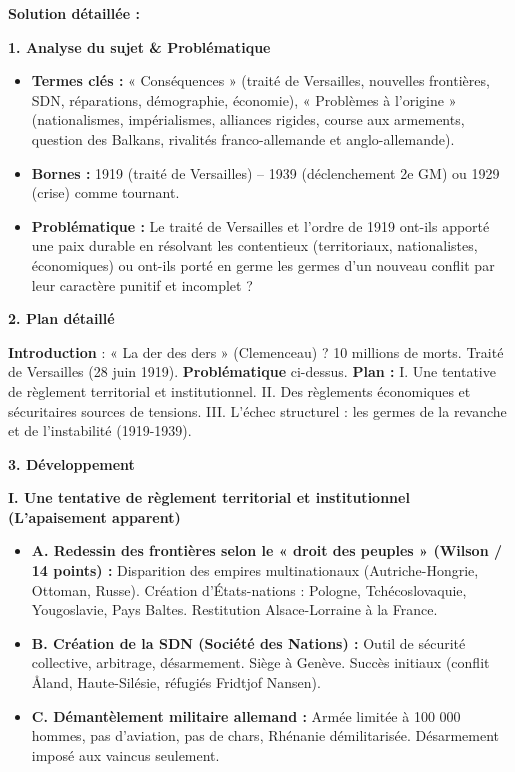 \documentclass[11pt]{article}
\begin{document}
\begin{exoresolu}
\tcblower
\textbf{Solution détaillée :}

\noindent \textbf{1. Analyse du sujet \& Problématique}
\begin{itemize}
\item \textbf{Termes clés :} « Conséquences » (traité de Versailles, nouvelles frontières, SDN, réparations, démographie, économie), « Problèmes à l'origine » (nationalismes, impérialismes, alliances rigides, course aux armements, question des Balkans, rivalités franco-allemande et anglo-allemande).
\item \textbf{Bornes :} 1919 (traité de Versailles) -- 1939 (déclenchement 2e GM) ou 1929 (crise) comme tournant.
\item \textbf{Problématique :} Le traité de Versailles et l'ordre de 1919 ont-ils apporté une paix durable en résolvant les contentieux (territoriaux, nationalistes, économiques) ou ont-ils porté en germe les germes d'un nouveau conflit par leur caractère punitif et incomplet ?
\end{itemize}

\noindent \textbf{2. Plan détaillé}

\noindent \textbf{Introduction} : « La der des ders » (Clemenceau) ? 10 millions de morts. Traité de Versailles (28 juin 1919). \textbf{Problématique} ci-dessus. \textbf{Plan :} I. Une tentative de règlement territorial et institutionnel. II. Des règlements économiques et sécuritaires sources de tensions. III. L'échec structurel : les germes de la revanche et de l'instabilité (1919-1939).

\noindent \textbf{3. Développement}

\noindent \textbf{I. Une tentative de règlement territorial et institutionnel (L'apaisement apparent)}
\begin{itemize}
\item \textbf{A. Redessin des frontières selon le « droit des peuples » (Wilson / 14 points) :} Disparition des empires multinationaux (Autriche-Hongrie, Ottoman, Russe). Création d'États-nations : Pologne, Tchécoslovaquie, Yougoslavie, Pays Baltes. Restitution Alsace-Lorraine à la France.
\item \textbf{B. Création de la SDN (Société des Nations) :} Outil de sécurité collective, arbitrage, désarmement. Siège à Genève. Succès initiaux (conflit Åland, Haute-Silésie, réfugiés Fridtjof Nansen).
\item \textbf{C. Démantèlement militaire allemand :} Armée limitée à 100 000 hommes, pas d'aviation, pas de chars, Rhénanie démilitarisée. Désarmement imposé aux vaincus seulement.
\end{itemize}


\end{exoresolu}
\end{document}
